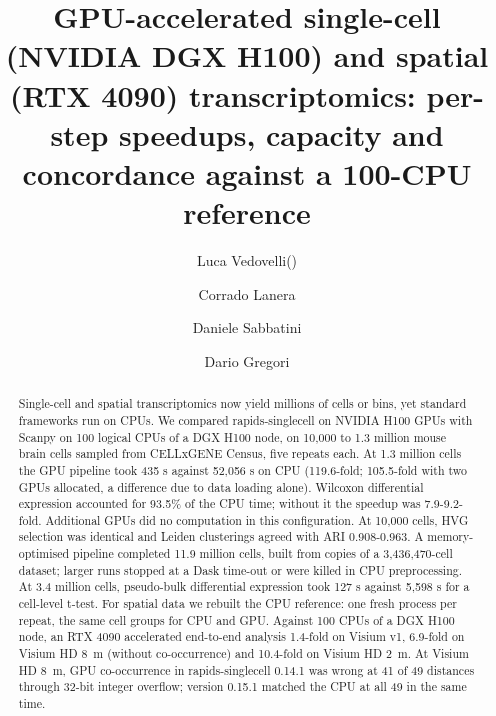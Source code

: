 \documentclass[runningheads]{llncs}
\begin{document}
\title{GPU-accelerated single-cell (NVIDIA DGX H100) and spatial (RTX 4090) transcriptomics: per-step speedups, capacity and concordance against a 100-CPU reference}
\author{Luca Vedovelli(\Envelope) \and Corrado Lanera \and Daniele Sabbatini \and Dario Gregori}
\maketitle
\begin{abstract}
Single-cell and spatial transcriptomics now yield millions of cells or bins, yet standard frameworks run on CPUs. We compared rapids-singlecell on NVIDIA H100 GPUs with Scanpy on 100 logical CPUs of a DGX H100 node, on 10,000 to 1.3 million mouse brain cells sampled from CELLxGENE Census, five repeats each. At 1.3 million cells the GPU pipeline took 435 s against 52,056 s on CPU (119.6-fold; 105.5-fold with two GPUs allocated, a difference due to data loading alone). Wilcoxon differential expression accounted for 93.5\% of the CPU time; without it the speedup was 7.9-9.2-fold. Additional GPUs did no computation in this configuration. At 10,000 cells, HVG selection was identical and Leiden clusterings agreed with ARI 0.908-0.963. A memory-optimised pipeline completed 11.9 million cells, built from copies of a 3,436,470-cell dataset; larger runs stopped at a Dask time-out or were killed in CPU preprocessing. At 3.4 million cells, pseudo-bulk differential expression took 127 s against 5,598 s for a cell-level t-test. For spatial data we rebuilt the CPU reference: one fresh process per repeat, the same cell groups for CPU and GPU. Against 100 CPUs of a DGX H100 node, an RTX 4090 accelerated end-to-end analysis 1.4-fold on Visium v1, 6.9-fold on Visium HD 8~\textmu{}m (without co-occurrence) and 10.4-fold on Visium HD 2~\textmu{}m. At Visium HD 8~\textmu{}m, GPU co-occurrence in rapids-singlecell 0.14.1 was wrong at 41 of 49 distances through 32-bit integer overflow; version 0.15.1 matched the CPU at all 49 in the same time.
\end{abstract}
\end{document}
